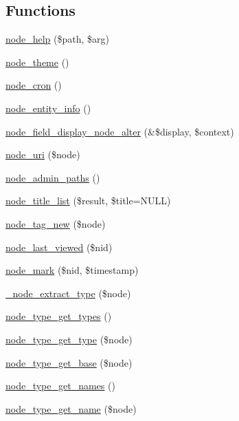 \subsection*{Functions}
\begin{DoxyCompactItemize}
\item 
\hyperlink{node_8module_ad86b5b8d1b77f20fefbfe16b13419520}{node\_\-help} (\$path, \$arg)
\item 
\hyperlink{node_8module_a91c71dff56ba2e39ee5f0233916bca08}{node\_\-theme} ()
\item 
\hyperlink{node_8module_a73900233bedb93afcf66aee69d05c026}{node\_\-cron} ()
\item 
\hyperlink{node_8module_aaf9f722394e2a25a4bd17e53d9923bfa}{node\_\-entity\_\-info} ()
\item 
\hyperlink{node_8module_af7264f779bfc22a3d1373bda83ccaea8}{node\_\-field\_\-display\_\-node\_\-alter} (\&\$display, \$context)
\item 
\hyperlink{node_8module_aa809f2afb7e8cba7f972b1fa7bc4fc38}{node\_\-uri} (\$node)
\item 
\hyperlink{node_8module_ab741d57a109d08dee6ac1a13137038ea}{node\_\-admin\_\-paths} ()
\item 
\hyperlink{node_8module_a5360ff37933a1c73adce0602395ddbea}{node\_\-title\_\-list} (\$result, \$title=NULL)
\item 
\hyperlink{node_8module_aece74434cfb1fff50a99138d10b10f6a}{node\_\-tag\_\-new} (\$node)
\item 
\hyperlink{node_8module_a95211205a8e6b1181239842b2428666d}{node\_\-last\_\-viewed} (\$nid)
\item 
\hyperlink{node_8module_a33745a626aae6ed3852904a34d587c57}{node\_\-mark} (\$nid, \$timestamp)
\item 
\hyperlink{node_8module_af5a973d62c30cddb155f6b5609439efe}{\_\-node\_\-extract\_\-type} (\$node)
\item 
\hyperlink{node_8module_a262f15c6263315491887a08914dfe126}{node\_\-type\_\-get\_\-types} ()
\item 
\hyperlink{node_8module_a0989ce8c8f1d5abbf5db159c77e68fc4}{node\_\-type\_\-get\_\-type} (\$node)
\item 
\hyperlink{node_8module_a309f62ec3eac10a30b2b2fa52da88679}{node\_\-type\_\-get\_\-base} (\$node)
\item 
\hyperlink{node_8module_aa34a830a516a8fb62280a6e5df20acd8}{node\_\-type\_\-get\_\-names} ()
\item 
\hyperlink{node_8module_acca428605d649d2a4b025bb8b32e24fd}{node\_\-type\_\-get\_\-name} (\$node)

\end{DoxyCompactItemize}
